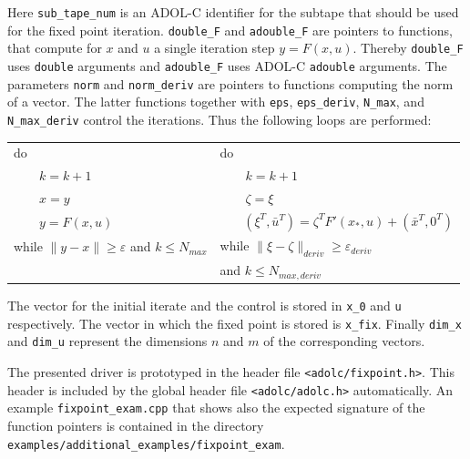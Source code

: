 \documentclass[11pt,twoside]{article}
\begin{document}
%
Here {\tt sub\_tape\_num} is an ADOL-C identifier for the subtape that
should be used for the fixed point iteration.
{\tt double\_F} and {\tt adouble\_F} are pointers to functions, that
compute for $x$ and $u$ a single iteration step $y=F(x,u)$. Thereby
{\tt double\_F} uses {\tt double} arguments and {\tt adouble\_F}
uses ADOL-C {\tt adouble} arguments. The parameters {\tt norm} and
{\tt norm\_deriv} are pointers to functions computing the norm
of a vector. The latter functions together with {\tt eps},
{\tt eps\_deriv}, {\tt N\_max}, and {\tt N\_max\_deriv} control
the iterations. Thus the following loops are performed:
\begin{center}
\begin{tabular}{ll}
  do                     &   do                           \\
  ~~~~$k = k+1$          &   ~~~~$k = k+1$                \\
  ~~~~$x = y$            &   ~~~~$\zeta = \xi$            \\
  ~~~~$y = F(x,u)$       &   ~~~
  $(\xi^T,\bar u^T) = \zeta^TF'(x_*,u) + (\bar x^T, 0^T)$ \\
  while $\|y-x\|\geq\varepsilon$ and $k\leq N_{max}$ \hspace*{0.5cm} &
  while $\|\xi -\zeta\|_{deriv}\geq\varepsilon_{deriv}$   \\
  & and $k\leq N_{max,deriv}$
\end{tabular}
\end{center}
The vector for the initial iterate and the control is stored
in {\tt x\_0} and {\tt u} respectively. The vector in which the
fixed point is stored is {\tt x\_fix}. Finally {\tt dim\_x}
and {\tt dim\_u} represent the dimensions $n$ and $m$ of the
corresponding vectors.

The presented driver is prototyped in the header file 
\verb=<adolc/fixpoint.h>=. This header
is included by the global header file \verb=<adolc/adolc.h>= automatically. 
An example \verb=fixpoint_exam.cpp= that shows also the
expected signature of the function pointers is contained in the directory \verb=examples/additional_examples/fixpoint_exam=.
%
\end{document}
